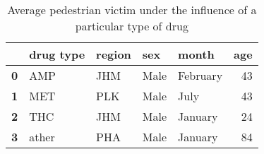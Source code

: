 \begin{table}
\caption{Average pedestrian victim under the influence of a particular type of drug}
\begin{tabular}{lllllr}
\toprule
 & drug type & region & sex & month & age \\
\midrule
\textbf{0} & AMP & JHM & Male & February & 43 \\
\textbf{1} & MET & PLK & Male & July & 43 \\
\textbf{2} & THC & JHM & Male & January & 24 \\
\textbf{3} & ather & PHA & Male & January & 84 \\
\bottomrule
\end{tabular}
\end{table}
